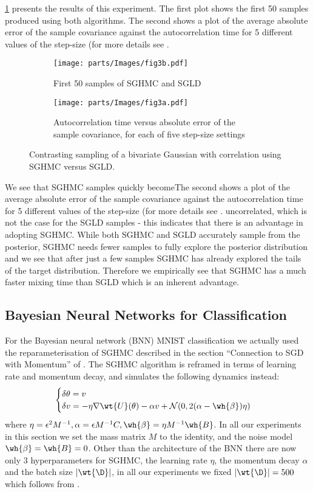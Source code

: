\cref{fig:sghmc vs sgld} presents the results of this experiment. The first plot shows the first 50 samples produced using both algorithms. The second shows a plot of the average absolute error of the sample covariance against the autocorrelation time for 5 different values of the step-size (for more details see \cite{sghmc}.
\begin{figure}[h!]
  \begin{subfigure}{.5\textwidth}
  \texttt{[image: parts/Images/fig3b.pdf]}
  \caption{First 50 samples of SGHMC and SGLD}
  \end{subfigure}
  \begin{subfigure}{.5\textwidth}
  \texttt{[image: parts/Images/fig3a.pdf]}
  \caption{Autocorrelation time versus absolute error of the sample covariance, for each of five step-size settings}
  \end{subfigure}%
  \caption{Contrasting sampling of a bivariate Gaussian with correlation using SGHMC versus SGLD.}
  \label{fig:sghmc vs sgld}
\end{figure}
We see that SGHMC samples quickly becomeThe second shows a plot of the average absolute error of the sample covariance against the autocorrelation time for 5 different values of the step-size (for more details see \cite{sghmc}. uncorrelated, which is not the case for the SGLD samples - this indicates that there is an advantage in adopting SGHMC. While both SGHMC and SGLD accurately sample from the posterior, SGHMC needs fewer samples to fully explore the posterior distribution and we see that after just a few samples SGHMC has already explored the tails of the target distribution. Therefore we empirically see that SGHMC has a much faster mixing time than SGLD which is an inherent advantage.

\subsection{Bayesian Neural Networks for Classification}
For the Bayesian neural network (BNN) MNIST classification we actually used the reparameterisation of SGHMC described in the section ``Connection to SGD with Momentum'' of \cite{sghmc}. The SGHMC algorithm is reframed in terms of learning rate and momentum decay, and simulates the following dynamics instead:
$$\begin{cases}
\delta \theta = v\\
\delta v = - \eta \nabla \wt{U}(\theta) - \alpha v + \mathcal{N}(0, 2(\alpha - \wh{\beta}) \eta)
\end{cases}
$$
where $\eta = \epsilon^2 M^{-1}, \alpha = \epsilon M^{-1}C, \wh{\beta} = \eta M^{-1}\wh{B}$. In all our experiments in this section we set the mass matrix $M $ to the identity, and the noise model $\wh{\beta} = \wh{B} = 0$. Other than the architecture of the BNN there are now only 3 hyperparameters for SGHMC, the learning rate $\eta$, the momentum decay $\alpha$ and the batch size $|\wt{\D}|$, in all our experiments we fixed $|\wt{\D}| = 500$ which follows from \cite{sghmc}.


